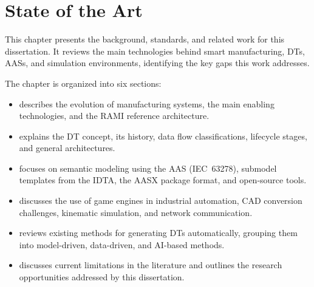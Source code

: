 
%

\chapter{State of the Art}
\label{cha:stateoftheart}


\epigraphfontsize{\small\itshape}
\setlength\epigraphwidth{12.5cm}
\setlength\epigraphrule{0pt}

This chapter presents the background, standards, and related work for this dissertation. It reviews the main technologies behind smart manufacturing, \glspl{DT}, \glspl{AAS}, and simulation environments, identifying the key gaps this work addresses.

The chapter is organized into six sections:
\begin{itemize}
    \item {} describes the evolution of manufacturing systems, the main enabling technologies, and the \gls{RAMI} reference architecture.
    \item {} explains the \gls{DT} concept, its history, data flow classifications, lifecycle stages, and general architectures.
    \item {} focuses on semantic modeling using the \gls{AAS} (\gls{IEC}~63278), submodel templates from the \gls{IDTA}, the \gls{AASX} package format, and open-source tools.
    \item {} discusses the use of game engines in industrial automation, \gls{CAD} conversion challenges, kinematic simulation, and network communication.
    \item {} reviews existing methods for generating \glspl{DT} automatically, grouping them into model-driven, data-driven, and \gls{AI}-based methods.
    \item {} discusses current limitations in the literature and outlines the research opportunities addressed by this dissertation.
\end{itemize}

